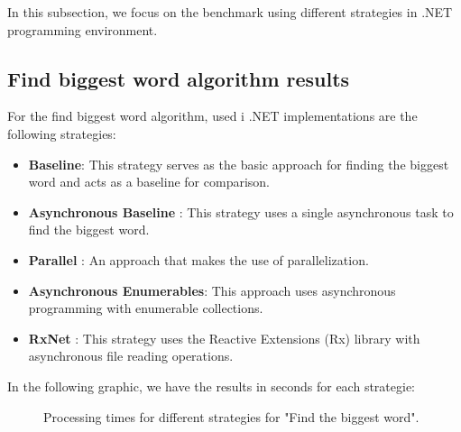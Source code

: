 In this subsection, we focus on the benchmark using different strategies in .NET programming environment.



\subsection{Find biggest word algorithm results}
\label{subsubsec:biggest_word_results_cs}

For the find biggest word algorithm, used i .NET implementations are the following strategies:

\begin{itemize}
    \item \textbf{Baseline}: This strategy serves as the basic approach for finding the biggest word and acts as a baseline for comparison.
    \item \textbf{Asynchronous Baseline }: This strategy uses a single asynchronous task to find the biggest word.
    \item \textbf{Parallel }: An approach that makes the use of parallelization.
    \item \textbf{Asynchronous Enumerables}: This approach uses asynchronous programming with enumerable collections.
    \item \textbf{RxNet }: This strategy uses the Reactive Extensions (Rx) library with asynchronous file reading operations.
\end{itemize}


In the following graphic, we have the results in seconds for each strategie:

\begin{figure}[H]
    \centering
    \caption{Processing times for different strategies for "Find the biggest word".}
    \label{fig:biggest_word_results_cs_2}
\end{figure}


